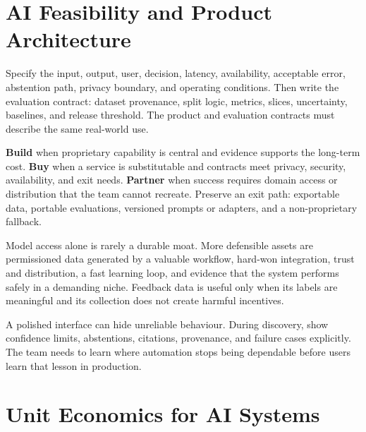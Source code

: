 \section{AI Feasibility and Product Architecture}

\begin{tcbitemize}[skin=sectionraster]
\tcbitem[title={Define the Product Contract},raster multicolumn=3]
Specify the input, output, user, decision, latency, availability, acceptable
error, abstention path, privacy boundary, and operating conditions.
Then write the evaluation contract: dataset provenance, split logic, metrics,
slices, uncertainty, baselines, and release threshold.
The product and evaluation contracts must describe the same real-world use.

\tcbitem[title={Build, Buy, or Partner},raster multicolumn=3]
\textbf{Build} when proprietary capability is central and evidence supports
the long-term cost.
\textbf{Buy} when a service is substitutable and contracts meet privacy,
security, availability, and exit needs.
\textbf{Partner} when success requires domain access or distribution that the
team cannot recreate.
Preserve an exit path: exportable data, portable evaluations, versioned
prompts or adapters, and a non-proprietary fallback.

\tcbitem[title={Where Defensibility Comes From},raster multicolumn=6]
Model access alone is rarely a durable moat.
More defensible assets are permissioned data generated by a valuable workflow,
hard-won integration, trust and distribution, a fast learning loop, and
evidence that the system performs safely in a demanding niche.
Feedback data is useful only when its labels are meaningful and its collection
does not create harmful incentives.
\end{tcbitemize}

\begin{engineernote}
A polished interface can hide unreliable behaviour.
During discovery, show confidence limits, abstentions, citations, provenance,
and failure cases explicitly.
The team needs to learn where automation stops being dependable before users
learn that lesson in production.
\end{engineernote}

\section{Unit Economics for AI Systems}

